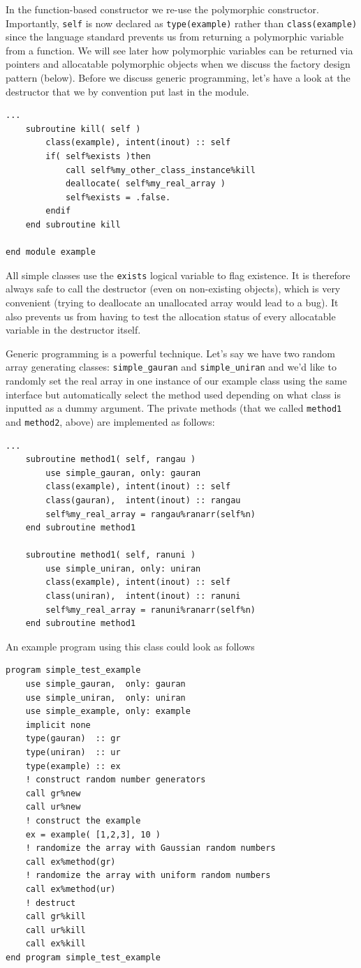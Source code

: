 \documentclass[a4paper,11pt]{article}
\begin{document}
In the function-based constructor we re-use the polymorphic constructor. Importantly, \texttt{self} is now declared as \texttt{type(example)} rather than \texttt{class(example)} since the language standard prevents us from returning a polymorphic variable from a function. We will see later how polymorphic variables can be returned via pointers and allocatable polymorphic objects when we discuss the factory design pattern (below). Before we discuss generic programming, let's have a look at the destructor that we by convention put last in the module.
\begin{verbatim}
...
    subroutine kill( self )
        class(example), intent(inout) :: self
        if( self%exists )then
            call self%my_other_class_instance%kill
            deallocate( self%my_real_array )
            self%exists = .false.
        endif
    end subroutine kill

end module example
\end{verbatim}
All simple classes use the \texttt{exists} logical variable to flag existence. It is therefore always safe to call the destructor (even on non-existing objects), which is very convenient (trying to deallocate an unallocated array would lead to a bug). It also prevents us from having to test the allocation status of every allocatable variable in the destructor itself. 

Generic programming is a powerful technique. Let's say we have two random array generating classes: \texttt{simple\_gauran} and \texttt{simple\_uniran} and we'd like to randomly set the real array in one instance of our example class using the same interface but automatically select the method used depending on what class is inputted as a dummy argument. The private methods (that we called \texttt{method1} and \texttt{method2}, above) are implemented as follows:
\begin{verbatim}
...
    subroutine method1( self, rangau )
        use simple_gauran, only: gauran
        class(example), intent(inout) :: self
        class(gauran),  intent(inout) :: rangau
        self%my_real_array = rangau%ranarr(self%n)
    end subroutine method1

    subroutine method1( self, ranuni )
        use simple_uniran, only: uniran
        class(example), intent(inout) :: self
        class(uniran),  intent(inout) :: ranuni
        self%my_real_array = ranuni%ranarr(self%n)
    end subroutine method1
\end{verbatim}
An example program using this class could look as follows
\begin{verbatim}
program simple_test_example
    use simple_gauran,  only: gauran
    use simple_uniran,  only: uniran
    use simple_example, only: example
    implicit none
    type(gauran)  :: gr
    type(uniran)  :: ur
    type(example) :: ex
    ! construct random number generators
    call gr%new 
    call ur%new
    ! construct the example
    ex = example( [1,2,3], 10 )
    ! randomize the array with Gaussian random numbers
    call ex%method(gr)
    ! randomize the array with uniform random numbers 
    call ex%method(ur)
    ! destruct
    call gr%kill
    call ur%kill
    call ex%kill
end program simple_test_example
\end{verbatim}
\end{document}
